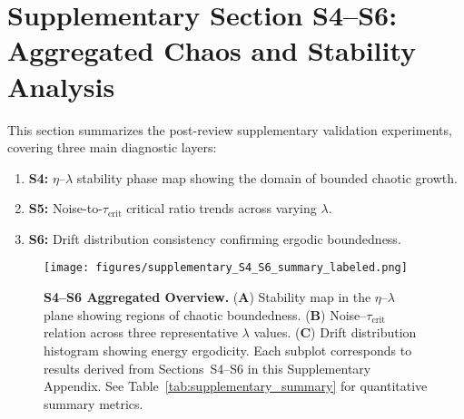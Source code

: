
\clearpage
\appendix
\section*{Supplementary Section S4--S6: Aggregated Chaos and Stability Analysis}

\noindent
This section summarizes the post-review supplementary validation experiments,
covering three main diagnostic layers:
\begin{enumerate}
  \item \textbf{S4:} $\eta$--$\lambda$ stability phase map showing the domain of bounded chaotic growth.
  \item \textbf{S5:} Noise-to-$\tau_{\mathrm{crit}}$ critical ratio trends across varying $\lambda$.
  \item \textbf{S6:} Drift distribution consistency confirming ergodic boundedness.
\end{enumerate}

\vspace{1em}

\begin{figure}[h!]
    \centering
    \texttt{[image: figures/supplementary\_S4\_S6\_summary\_labeled.png]}
    \caption{
        \textbf{S4--S6 Aggregated Overview.}
        (\textbf{A}) Stability map in the $\eta$--$\lambda$ plane showing regions of chaotic boundedness.
        (\textbf{B}) Noise--$\tau_{\mathrm{crit}}$ relation across three representative $\lambda$ values.
        (\textbf{C}) Drift distribution histogram showing energy ergodicity.
        Each subplot corresponds to results derived from Sections~S4--S6 in this Supplementary Appendix.
        See Table~\ref{tab:supplementary_summary} for quantitative summary metrics.
    }
    \label{fig:s4s6_summary}
\end{figure}

\vspace{1em}



